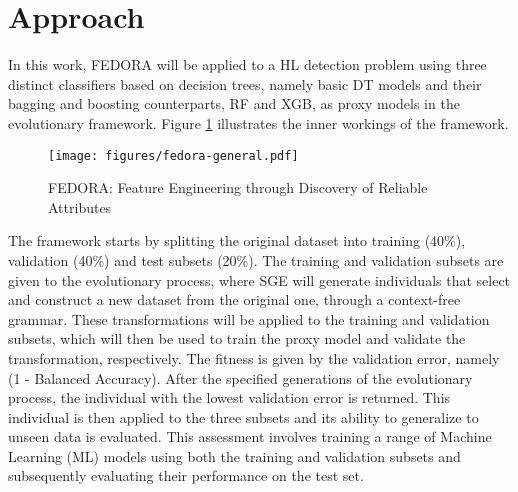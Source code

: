 \section{Approach}

In this work, FEDORA \cite{rabuge2024comparison} will be applied to a \gls{HL} detection problem using three distinct classifiers based on decision trees, namely basic \gls{DT} models and their bagging and boosting counterparts, \gls{RF} and \gls{XGB}, as proxy models in the evolutionary framework. Figure \ref{fig:fedora} illustrates the inner workings of the framework.

\begin{figure}
    \centering
    \texttt{[image: figures/fedora-general.pdf]}
    \caption{FEDORA: Feature Engineering through Discovery of Reliable Attributes}
    \label{fig:fedora}
\end{figure}

The framework starts by splitting the original dataset into training (40\%), validation (40\%) and test subsets (20\%). The training and validation subsets are given to the evolutionary process, where \gls{SGE} will generate individuals that select and construct a new dataset from the original one, through a context-free grammar. These transformations will be applied to the training and validation subsets, which will then be used to train the proxy model and validate the transformation, respectively. The fitness is given by the validation error, namely (1 - Balanced Accuracy). After the specified generations of the evolutionary process, the individual with the lowest validation error is returned. This individual is then applied to the three subsets and its ability to generalize to unseen data is evaluated. This assessment involves training a range of Machine Learning (ML) models using both the training and validation subsets and subsequently evaluating their performance on the test set.